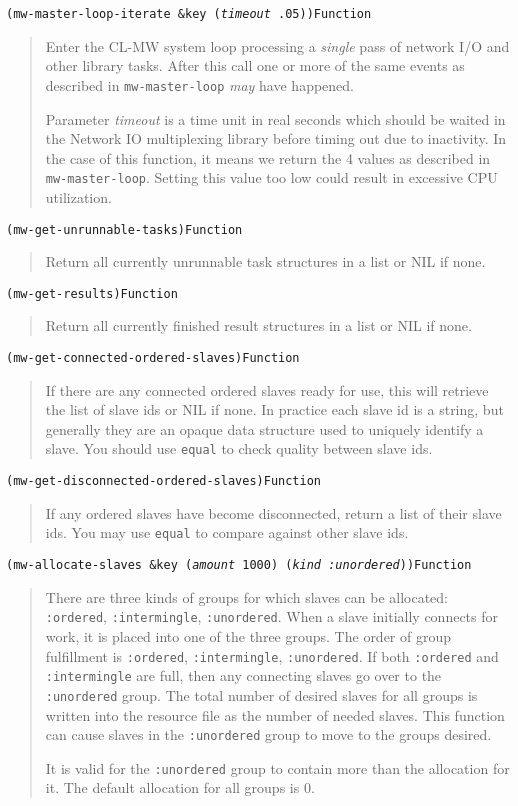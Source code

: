 \documentclass[titlepage,12pt]{book}
\newcommand{\xsmall}{\latexhtml{\small}{}}
\newcommand{\xnormalsize}{\latexhtml{\normalsize}{}}
\newcommand{\clmw}{\xsmall\textsc{CL-MW}\xnormalsize\xspace}
\newcommand{\un}{\texttt{:unordered}\xspace}
\newcommand{\inter}{\texttt{:intermingle}\xspace}
\newcommand{\ord}{\texttt{:ordered}\xspace}
\newcommand{\func}[1]{\mbox{\texttt{#1}}\xspace}
\newcommand{\apifunc}[2]{\noindent\xsmall\texttt{(#1)}\hspace*{\fill}\xnormalsize\texttt{#2}}
\newenvironment{apientry}[2]
	{\apifunc{#1}{#2}\begin{quotation}}
	{\end{quotation}}
\begin{document}
\begin{apientry}
{mw-master-loop-iterate \&key (\emph{timeout} .05)}
{Function}
Enter the \clmw system loop processing a \emph{single} pass of network
I/O and other library tasks. After this call one or more of the same events
as described in \func{mw-master-loop} \emph{may} have happened.

Parameter \emph{timeout} is a time unit in real seconds which should
be waited in the Network IO multiplexing library before timing out
due to inactivity.  In the case of this function, it means we return
the 4 values as described in \func{mw-master-loop}. Setting this value
too low could result in excessive CPU utilization.

\end{apientry}

\begin{apientry}
{mw-get-unrunnable-tasks}
{Function}
Return all currently unrunnable task structures in a list or NIL if none.
\end{apientry}

\begin{apientry}
{mw-get-results}
{Function}
Return all currently finished result structures in a list or NIL if none.
\end{apientry}

\begin{apientry}
{mw-get-connected-ordered-slaves}
{Function}
If there are any connected ordered slaves ready for use, this will
retrieve the list of slave ids or NIL if none. In practice each slave
id is a string, but generally they are an opaque data structure used
to uniquely identify a slave. You should use \func{equal} to check
quality between slave ids.
\end{apientry}

\begin{apientry}
{mw-get-disconnected-ordered-slaves}
{Function}
If any ordered slaves have become disconnected, return a list of
their slave ids. You may use \func{equal} to compare against other
slave ids.
\end{apientry}

\begin{apientry}
{mw-allocate-slaves \&key (\emph{amount} 1000) (\emph{kind :unordered})}
{Function}
There are three kinds of groups for which slaves can be allocated:
\ord, \inter, \un.  When a slave initially connects for work, it is
placed into one of the three groups.  The order of group fulfillment
is \ord, \inter, \un. If both \ord and \inter are full, then any
connecting slaves go over to the \un group. The total number of desired
slaves for all groups is written into the resource file as the number of
needed slaves. This function can cause slaves in the \un group to move to
the groups desired.

It is valid for the \un group to contain more than the allocation for
it.  The default allocation for all groups is 0.
\end{apientry}
\end{document}
